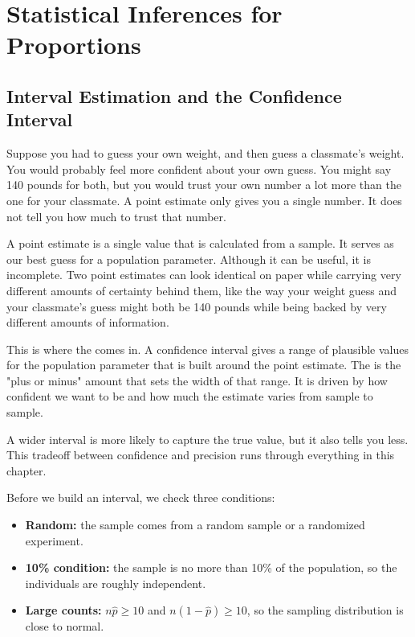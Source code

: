\chapter{Statistical Inferences for Proportions}

\section{Interval Estimation and the Confidence Interval}

Suppose you had to guess your own weight, and then guess a classmate's
weight. You would probably feel more confident about your own guess. You
might say 140 pounds for both, but you would trust your own number a lot
more than the one for your classmate. A point estimate only gives you a
single number. It does not tell you how much to trust that number.

A point estimate is a single value that is calculated from a sample. It
serves as our best guess for a population parameter. Although it can be
useful, it is incomplete. Two point estimates can look identical on paper
while carrying very different amounts of certainty behind them, like the
way your weight guess and your classmate's guess might both be 140 pounds
while being backed by very different amounts of information.

This is where the 
comes in. A confidence interval gives a range of plausible values for the
population parameter that is built around the point estimate. The
 is the "plus or minus"
amount that sets the width of that range. It is driven by how confident we
want to be and how much the estimate varies from sample to sample.


A wider interval is more likely to capture the true value, but it also
tells you less. This tradeoff between confidence and precision runs through
everything in this chapter.

Before we build an interval, we check three conditions:
\begin{itemize}
\item \textbf{Random:} the sample comes from a random sample or a randomized experiment.
\item \textbf{10\% condition:} the sample is no more than 10\% of the population, so the individuals are roughly independent.
\item \textbf{Large counts:} $n\hat{p} \geq 10$ and $n(1-\hat{p}) \geq 10$, so the sampling distribution is close to normal.
\end{itemize}

